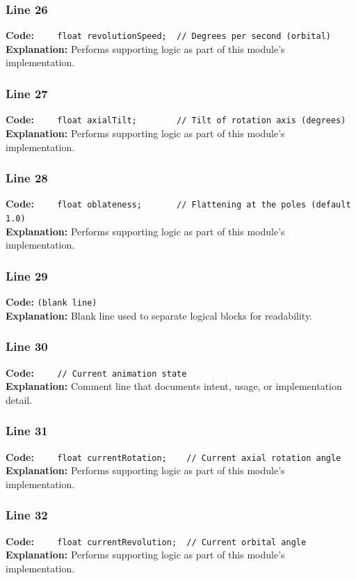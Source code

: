 \documentclass[11pt,a4paper]{article}
\begin{document}
\subsubsection*{Line 26}
\textbf{Code:} \verb|    float revolutionSpeed;  // Degrees per second (orbital)|\\
\textbf{Explanation:} Performs supporting logic as part of this module's implementation.

\subsubsection*{Line 27}
\textbf{Code:} \verb|    float axialTilt;        // Tilt of rotation axis (degrees)|\\
\textbf{Explanation:} Performs supporting logic as part of this module's implementation.

\subsubsection*{Line 28}
\textbf{Code:} \verb|    float oblateness;       // Flattening at the poles (default 1.0)|\\
\textbf{Explanation:} Performs supporting logic as part of this module's implementation.

\subsubsection*{Line 29}
\textbf{Code:} \texttt{(blank line)}\\
\textbf{Explanation:} Blank line used to separate logical blocks for readability.

\subsubsection*{Line 30}
\textbf{Code:} \verb|    // Current animation state|\\
\textbf{Explanation:} Comment line that documents intent, usage, or implementation detail.

\subsubsection*{Line 31}
\textbf{Code:} \verb|    float currentRotation;    // Current axial rotation angle|\\
\textbf{Explanation:} Performs supporting logic as part of this module's implementation.

\subsubsection*{Line 32}
\textbf{Code:} \verb|    float currentRevolution;  // Current orbital angle|\\
\textbf{Explanation:} Performs supporting logic as part of this module's implementation.
\end{document}
